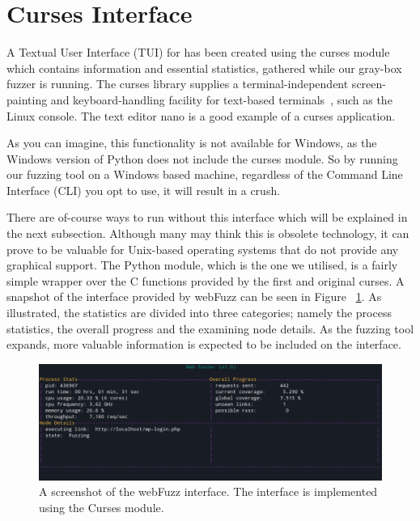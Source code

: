 \section{Curses Interface}
A Textual User Interface (TUI) for \pname{} has been created using the curses module which contains information and essential statistics, gathered while our gray-box fuzzer is running. The curses library supplies a terminal-independent screen-painting and keyboard-handling facility for text-based terminals~\cite{curses}, such as the Linux console. The text editor nano is a good example of a curses application. 

As you can imagine, this functionality is not available for Windows, as the Windows version of Python does not include the curses module. So by running our fuzzing tool on a Windows based machine, regardless of the Command Line Interface (CLI) you opt to use, it will result in a crush. 

There are of-course ways to run \pname{} without this interface which will be explained in the next subsection. Although many may think this is obsolete technology, it can prove to be  valuable for Unix-based operating systems that do not provide any graphical support. The Python module, which is the one we utilised, is a fairly simple wrapper over the C functions provided by the first and original curses. A snapshot of the interface provided by webFuzz can be seen in Figure ~\ref{fig:curses_interface}. As illustrated, the statistics are divided into three categories; namely the process statistics, the overall progress and the examining node details.
As the fuzzing tool expands, more valuable information is expected to be included on the interface.

\begin{figure}[ht]
 \centering
 \captionsetup{justification=centering}
 \includegraphics[width=\linewidth]{figures/curses.png}
 \caption{A screenshot of the webFuzz interface. The interface is implemented using the Curses module.}
 \label{fig:curses_interface}
\end{figure}


